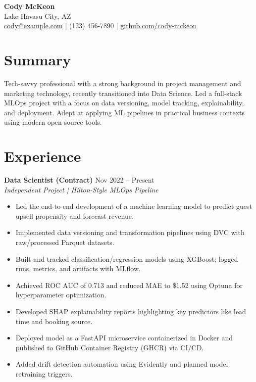 \documentclass[a4paper,10pt]{article}
\begin{document}
\begin{center}
    {\LARGE \textbf{Cody McKeon}} \\
    \vspace{4pt}
    Lake Havasu City, AZ \\
    \href{mailto:cody@example.com}{cody@example.com} | (123) 456-7890 | \href{https://github.com/cody-mckeon}{github.com/cody-mckeon}
\end{center}

\vspace{8pt}

\section*{Summary}
Tech-savvy professional with a strong background in project management and marketing technology, recently transitioned into Data Science. Led a full-stack MLOps project with a focus on data versioning, model tracking, explainability, and deployment. Adept at applying ML pipelines in practical business contexts using modern open-source tools.

\section*{Experience}

\textbf{Data Scientist (Contract)} \hfill Nov 2022 -- Present \\
\textit{Independent Project | Hilton-Style MLOps Pipeline} \\
\begin{itemize}[leftmargin=*]
    \item Led the end-to-end development of a machine learning model to predict guest upsell propensity and forecast revenue.
    \item Implemented data versioning and transformation pipelines using DVC with raw/processed Parquet datasets.
    \item Built and tracked classification/regression models using XGBoost; logged runs, metrics, and artifacts with MLflow.
    \item Achieved ROC AUC of 0.713 and reduced MAE to \$1.52 using Optuna for hyperparameter optimization.
    \item Developed SHAP explainability reports highlighting key predictors like lead time and booking source.
    \item Deployed model as a FastAPI microservice containerized in Docker and published to GitHub Container Registry (GHCR) via CI/CD.
    \item Added drift detection automation using Evidently and planned model retraining triggers.
\end{itemize}
\end{document}
